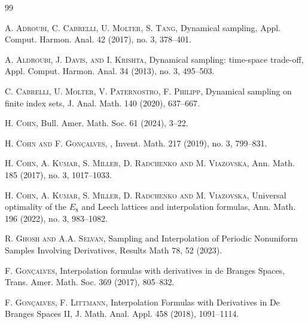 \documentclass[reqno]{amsart}
\theoremstyle{plain}
\theoremstyle{definition}
\numberwithin{equation}{section}
\begin{document}
\begin{thebibliography}{99}

\textsc{A. Adroubi, C. Cabrelli, U. Molter, S. Tang,}
\newblock Dynamical sampling,
\newblock Appl. Comput. Harmon. Anal. 42 (2017), no. 3, 378--401.

\textsc{A. Aldroubi, J. Davis, and I. Krishta,}
\newblock Dynamical sampling: time-space trade-off,
\newblock Appl. Comput. Harmon. Anal. 34 (2013), no. 3, 495--503.

\textsc{C. Cabrelli, U. Molter, V. Paternostro, F. Philipp,}
\newblock Dynamical sampling on finite index sets,
\newblock J. Anal. Math. 140 (2020), 637--667.

\textsc{H. Cohn,}
\newblock Bull. Amer. Math. Soc. 61 (2024), 3--22.


\textsc{H. Cohn and F. Gon\c calves},
,
\newblock Invent. Math. {217} (2019), no. 3, 799--831.

\textsc{H. Cohn, A. Kumar, S. Miller, D. Radchenko and M. Viazovska,}
\newblock Ann. Math. { 185} (2017), no. 3, 1017--1033.


\textsc{H. Cohn, A. Kumar, S. Miller, D. Radchenko and M. Viazovska,} 
\newblock  Universal optimality of the $E_8$ and Leech lattices and interpolation formulas,
\newblock Ann. Math. { 196} (2022), no. 3, 983--1082.

\textsc{R. Ghosh and A.A. Selvan,}
\newblock Sampling and Interpolation of Periodic Nonuniform Samples Involving Derivatives,
\newblock Results Math 78, 52 (2023).


\textsc{F. Gonçalves,}
\newblock Interpolation formulas with derivatives in de Branges Spaces, 
\newblock Trans. Amer. Math. Soc. 369 (2017), 805--832.

\textsc{F. Gonçalves, F. Littmann,}
\newblock Interpolation Formulas with Derivatives in De Branges Spaces II, 
\newblock  J. Math. Anal. Appl. 458 (2018), 1091--1114.


\end{thebibliography}
\end{document}
